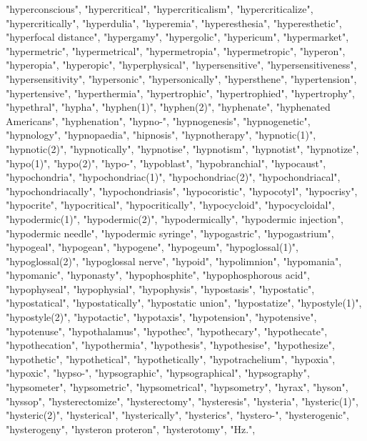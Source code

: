 "hyperconscious",
"hypercritical",
"hypercriticalism",
"hypercriticalize",
"hypercritically",
"hyperdulia",
"hyperemia",
"hyperesthesia",
"hyperesthetic",
"hyperfocal distance",
"hypergamy",
"hypergolic",
"hypericum",
"hypermarket",
"hypermetric",
"hypermetrical",
"hypermetropia",
"hypermetropic",
"hyperon",
"hyperopia",
"hyperopic",
"hyperphysical",
"hypersensitive",
"hypersensitiveness",
"hypersensitivity",
"hypersonic",
"hypersonically",
"hypersthene",
"hypertension",
"hypertensive",
"hyperthermia",
"hypertrophic",
"hypertrophied",
"hypertrophy",
"hypethral",
"hypha",
"hyphen(1)",
"hyphen(2)",
"hyphenate",
"hyphenated Americans",
"hyphenation",
"hypno-",
"hypnogenesis",
"hypnogenetic",
"hypnology",
"hypnopaedia",
"hipnosis",
"hypnotherapy",
"hypnotic(1)",
"hypnotic(2)",
"hypnotically",
"hypnotise",
"hypnotism",
"hypnotist",
"hypnotize",
"hypo(1)",
"hypo(2)",
"hypo-",
"hypoblast",
"hypobranchial",
"hypocaust",
"hypochondria",
"hypochondriac(1)",
"hypochondriac(2)",
"hypochondriacal",
"hypochondriacally",
"hypochondriasis",
"hypocoristic",
"hypocotyl",
"hypocrisy",
"hypocrite",
"hypocritical",
"hypocritically",
"hypocycloid",
"hypocycloidal",
"hypodermic(1)",
"hypodermic(2)",
"hypodermically",
"hypodermic injection",
"hypodermic needle",
"hypodermic syringe",
"hypogastric",
"hypogastrium",
"hypogeal",
"hypogean",
"hypogene",
"hypogeum",
"hypoglossal(1)",
"hypoglossal(2)",
"hypoglossal nerve",
"hypoid",
"hypolimnion",
"hypomania",
"hypomanic",
"hyponasty",
"hypophosphite",
"hypophosphorous acid",
"hypophyseal",
"hypophysial",
"hypophysis",
"hypostasis",
"hypostatic",
"hypostatical",
"hypostatically",
"hypostatic union",
"hypostatize",
"hypostyle(1)",
"hypostyle(2)",
"hypotactic",
"hypotaxis",
"hypotension",
"hypotensive",
"hypotenuse",
"hypothalamus",
"hypothec",
"hypothecary",
"hypothecate",
"hypothecation",
"hypothermia",
"hypothesis",
"hypothesise",
"hypothesize",
"hypothetic",
"hypothetical",
"hypothetically",
"hypotrachelium",
"hypoxia",
"hypoxic",
"hypso-",
"hypsographic",
"hypsographical",
"hypsography",
"hypsometer",
"hypsometric",
"hypsometrical",
"hypsometry",
"hyrax",
"hyson",
"hyssop",
"hysterectomize",
"hysterectomy",
"hysteresis",
"hysteria",
"hysteric(1)",
"hysteric(2)",
"hysterical",
"hysterically",
"hysterics",
"hystero-",
"hysterogenic",
"hysterogeny",
"hysteron proteron",
"hysterotomy",
"Hz.",
